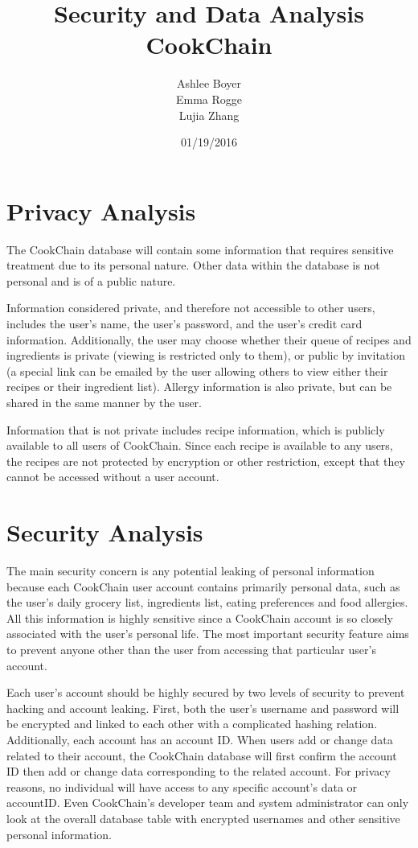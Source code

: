 \documentclass{article}
\title{\textbf{Security and Data Analysis  \\ CookChain}}
\author{Ashlee Boyer \\Emma Rogge \\ Lujia Zhang}
\date{01/19/2016}
\begin{document}
\maketitle
\renewcommand*\contentsname{Table of Contents} 
\newpage
\tableofcontents
\clearpage
\section{Privacy Analysis}
The CookChain database will contain some information that requires sensitive treatment due to its personal nature. Other data within the database is not personal and is of a public nature. 

Information considered private, and therefore not accessible to other users, includes the user's name, the user's password, and the user's credit card information. Additionally, the user may choose whether their queue of recipes and ingredients is private (viewing is restricted only to them), or public by invitation (a special link can be emailed by the user allowing others to view either their recipes or their ingredient list). Allergy information is also private, but can be shared in the same manner by the user.

Information that is not private includes recipe information, which is publicly available to all users of CookChain. Since each recipe is available to any users, the recipes are not protected by encryption or other restriction, except that they cannot be accessed without a user account. 
\section{Security Analysis}
The main security concern is any potential leaking of personal information because each CookChain user account contains primarily personal data, such as the user's daily grocery list, ingredients list, eating preferences and food allergies. All this information is highly sensitive since a CookChain account is so closely associated with the user's personal life. The most important security feature aims to prevent anyone other than the user from accessing that particular user's account.

Each user's account should be highly secured by two levels of security to prevent hacking and account leaking. First, both the user's username and password will be encrypted and linked to each other with a complicated hashing relation. Additionally, each account has an account ID. When users add or change data related to their account, the CookChain database will first confirm the account ID then add or change data corresponding to the related account. For privacy reasons, no individual will have access to any specific account's data or accountID. Even CookChain's developer team and system administrator can only look at the overall database table with encrypted usernames and other sensitive personal information.
\end{document}
